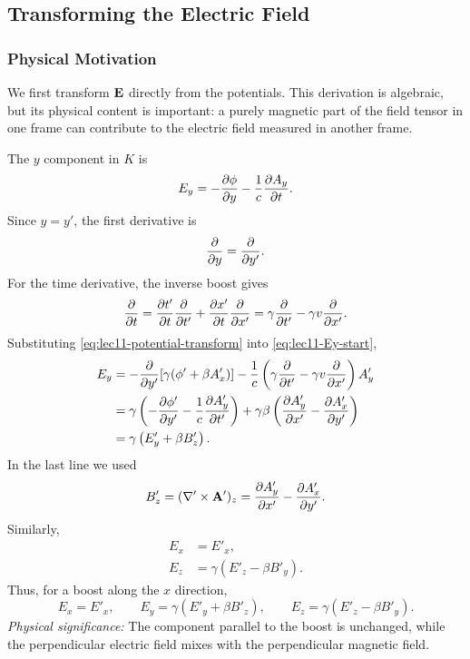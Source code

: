 \subsection{Transforming the Electric Field}\label{subsec:lec11-electric-transform}

\subsubsection*{Physical Motivation}
We first transform $\mathbf{E}$ directly from the potentials.  This derivation is algebraic,
but its physical content is important: a purely magnetic part of the field tensor
in one frame can contribute to the electric field measured in another frame.

The $y$ component in $K$ is
\begin{equation}\label{eq:lec11-Ey-start}
  E_y
  =
  -\pdv{\phi}{y}
  -\frac{1}{c}\pdv{A_y}{t}.
\end{equation}
Since $y=y'$, the first derivative is
\begin{equation}\label{eq:lec11-y-derivative}
  \pdv{}{y}=\pdv{}{y'}.
\end{equation}
For the time derivative, the inverse boost gives
\begin{equation}\label{eq:lec11-inverse-time-chain}
  \pdv{}{t}
  =
  \pdv{t'}{t}\pdv{}{t'}
  +
  \pdv{x'}{t}\pdv{}{x'}
  =
  \gamma\pdv{}{t'}
  -\gamma v\pdv{}{x'} .
\end{equation}
Substituting \eqref{eq:lec11-potential-transform} into \eqref{eq:lec11-Ey-start},
\begin{align}
  E_y
  &=
  -\pdv{}{y'}\!\left[\gamma(\phi'+\beta A'_x)\right]
  -\frac{1}{c}
  \left(\gamma\pdv{}{t'}-\gamma v\pdv{}{x'}\right)A'_y
  \notag\\
  &=
  \gamma\left(-\pdv{\phi'}{y'}-\frac{1}{c}\pdv{A'_y}{t'}\right)
  +\gamma\beta\left(\pdv{A'_y}{x'}-\pdv{A'_x}{y'}\right)
  \notag\\
  &=
  \gamma\left(E'_y+\beta B'_z\right).
  \label{eq:lec11-Ey-result}
\end{align}
In the last line we used
\begin{equation}\label{eq:lec11-Bz-def}
  B'_z=(\nabla'\times\mathbf{A}')_z
  =
  \pdv{A'_y}{x'}-\pdv{A'_x}{y'} .
\end{equation}
Similarly,
\begin{align}
  E_x &= E'_x, \label{eq:lec11-Ex-result}\\
  E_z &= \gamma(E'_z-\beta B'_y). \label{eq:lec11-Ez-result}
\end{align}
Thus, for a boost along the $x$ direction,
\begin{equation}\label{eq:lec11-E-components}
  \boxed{
  E_x=E'_x,\qquad
  E_y=\gamma(E'_y+\beta B'_z),\qquad
  E_z=\gamma(E'_z-\beta B'_y).
  }
\end{equation}
\textit{Physical significance:} The component parallel to the boost is unchanged,
while the perpendicular electric field mixes with the perpendicular magnetic field.

